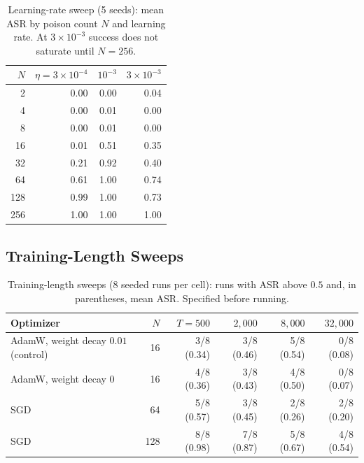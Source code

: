 \documentclass{article} %
\begin{document}
\begin{table}[ht]
\caption{Learning-rate sweep (5 seeds): mean ASR by poison count $N$ and learning rate. At $3\times10^{-3}$ success does not saturate until $N=256$.}
\label{tab:lrsweep}
\centering
\small
\begin{tabular}{rrrr}
\toprule
$N$ & $\eta=3\times10^{-4}$ & $10^{-3}$ & $3\times10^{-3}$ \\
\midrule
2 & 0.00 & 0.00 & 0.04 \\
4 & 0.00 & 0.01 & 0.00 \\
8 & 0.00 & 0.01 & 0.00 \\
16 & 0.01 & 0.51 & 0.35 \\
32 & 0.21 & 0.92 & 0.40 \\
64 & 0.61 & 1.00 & 0.74 \\
128 & 0.99 & 1.00 & 0.73 \\
256 & 1.00 & 1.00 & 1.00 \\
\bottomrule
\end{tabular}
\end{table}

\subsection{Training-Length Sweeps}
\label{app:ds}

\begin{table}[ht]
\caption{Training-length sweeps (8 seeded runs per cell): runs with ASR above $0.5$ and, in parentheses, mean ASR. Specified before running.}
\label{tab:ds4}
\centering
\small
\begin{tabular}{lrrrrr}
\toprule
Optimizer & $N$ & $T=500$ & $2{,}000$ & $8{,}000$ & $32{,}000$ \\
\midrule
AdamW, weight decay $0.01$ (control) & 16 & 3/8 (0.34) & 3/8 (0.46) & 5/8 (0.54) & 0/8 (0.08) \\
AdamW, weight decay $0$ & 16 & 4/8 (0.36) & 3/8 (0.43) & 4/8 (0.50) & 0/8 (0.07) \\
SGD & 64 & 5/8 (0.57) & 3/8 (0.45) & 2/8 (0.26) & 2/8 (0.20) \\
SGD & 128 & 8/8 (0.98) & 7/8 (0.87) & 5/8 (0.67) & 4/8 (0.54) \\
\bottomrule
\end{tabular}
\end{table}
\end{document}
